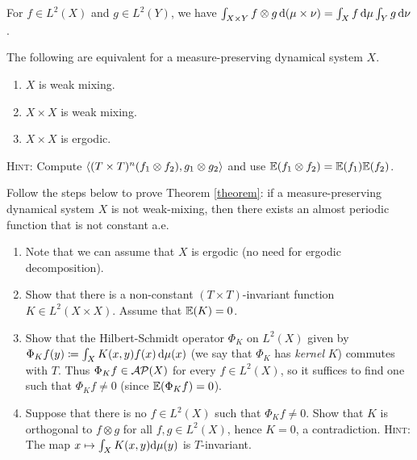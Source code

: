 \documentclass[reqno, twoside]{article}
\begin{document}
    \begin{fact*}
        For $f\in L^2(X)$ and $g\in L^2(Y)$, we have $\int_{X\times Y}f\otimes g\,\mathrm{d}(\mu\times\nu)=\int_Xf\,\mathrm{d}\mu\int_Yg\,\mathrm{d}\nu$.
    \end{fact*}

    \begin{exercise}\label{equiv}
        The following are equivalent for a measure-preserving dynamical system $X$.
        \begin{enumerate}
            \item $X$ is weak mixing.
                \vspace{-0.05in}
            \item $X\times X$ is weak mixing.
                \vspace{-0.05in}
            \item $X\times X$ is ergodic.
        \end{enumerate}
        \textsc{Hint:} Compute $\left\langle(T\times T)^n(f_1\otimes f_2),g_1\otimes g_2\right\rangle$ and use $\mathbb{E}(f_1\otimes f_2)=\mathbb{E}(f_1)\mathbb{E}(f_2)$.
    \end{exercise}

    \begin{exercise}
        Follow the steps below to prove Theorem \ref{theorem}: if a measure-preserving dynamical system $X$ is not weak-mixing, then there exists an almost periodic function that is not constant a.e.
        \begin{enumerate}
            \item Note that we can assume that $X$ is ergodic (no need for ergodic decomposition).
                \vspace{-0.05in}
            \item Show that there is a non-constant $(T\times T)$-invariant function $K\in L^2(X\times X)$. Assume that $\mathbb{E}(K)=0$.
                \vspace{-0.2in}
            \item Show that the Hilbert-Schmidt operator $\Phi_K$ on $L^2(X)$ given by $\Phi_Kf(y)\coloneqq\int_XK(x,y)f(x)\,\mathrm{d}\mu(x)$ (we say that $\Phi_K$ has \textit{kernel} $K$) commutes with $T$. Thus $\Phi_Kf\in\mathcal{AP}(X)$ for every $f\in L^2(X)$, so it suffices to find one such that $\Phi_Kf\neq0$ (since $\mathbb{E}(\Phi_Kf)=0$).
                \vspace{-0.05in}
            \item Suppose that there is no $f\in L^2(X)$ such that $\Phi_Kf\neq0$. Show that $K$ is orthogonal to $f\otimes g$ for all $f,g\in L^2(X)$, hence $K=0$, a contradiction. \textsc{Hint}: The map $x\mapsto\int_XK(x,y)\mathrm{d}\mu(y)$ is $T$-invariant.
        \end{enumerate}
    \end{exercise}
\end{document}
